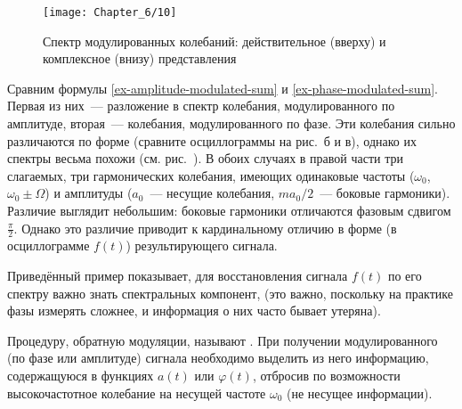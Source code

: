
\begin{wrapfigure}[16]{r}{0.4\textwidth}
\texttt{[image: Chapter\_6/10]}
    \caption{Спектр модулированных колебаний: действительное (вверху)
    и комплексное (внизу) представления}
\end{wrapfigure}

Сравним формулы \eqref{ex-amplitude-modulated-sum} и \eqref{ex-phase-modulated-sum}.
Первая из них~--- разложение в спектр колебания, модулированного по амплитуде,
вторая~--- колебания, модулированного по фазе. Эти колебания сильно различаются
по форме (сравните осциллограммы на рис.~б
и в), однако их спектры весьма похожи
(см. рис.~). В обоих случаях в правой части три
слагаемых, три гармонических колебания, имеющих одинаковые частоты ($\omega_0$,
$\omega_0\pm\Omega$) и амплитуды ($a_0$~--- несущие колебания, $ma_0/2$~---
боковые гармоники). Различие выглядит небольшим: боковые гармоники отличаются
фазовым сдвигом $\frac{\pi}{2}$. Однако это различие приводит к кардинальному
отличию в форме (в осциллограмме $f(t)$) результирующего сигнала.

Приведённый пример показывает, для восстановления сигнала $f(t)$ по его спектру важно
знать  спектральных компонент, 
(это важно, поскольку на практике фазы измерять сложнее, и информация о
них часто бывает утеряна).



Процедуру, обратную модуляции, называют .
При получении модулированного (по фазе или амплитуде) сигнала необходимо
выделить из него информацию, содержащуюся в функциях $a(t)$ или
$\varphi(t)$, отбросив по возможности высокочастотное колебание
на несущей частоте $\omega_0$ (не несущее информации).

